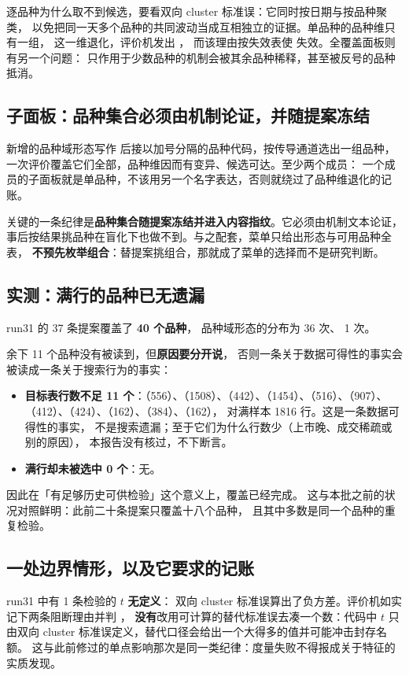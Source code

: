 \documentclass[11pt]{ctexart}
\begin{document}
逐品种为什么取不到候选，要看双向 cluster 标准误：它同时按日期与按品种聚类，
以免把同一天多个品种的共同波动当成互相独立的证据。单品种的品种维只有一组，
这一维退化，评价机发出 ，
而该理由按失效表使  失效。全覆盖面板则有另一个问题：
只作用于少数品种的机制会被其余品种稀释，甚至被反号的品种抵消。

\subsection{子面板：品种集合必须由机制论证，并随提案冻结}
新增的品种域形态写作  后接以加号分隔的品种代码，按传导通道选出一组品种，
一次评价覆盖它们全部，品种维因而有变异、候选可达。至少两个成员：
一个成员的子面板就是单品种，不该用另一个名字表达，否则就绕过了品种维退化的记账。

关键的一条纪律是\textbf{品种集合随提案冻结并进入内容指纹}。它必须由机制文本论证，
事后按结果挑品种在盲化下也做不到。与之配套，菜单只给出形态与可用品种全表，
\textbf{不预先枚举组合}：替提案挑组合，那就成了菜单的选择而不是研究判断。

\subsection{实测：满行的品种已无遗漏}
run31 的 37 条提案覆盖了 \textbf{40 个品种}，
品种域形态的分布为  36 次、 1 次。

余下 11 个品种没有被读到，但\textbf{原因要分开说}，
否则一条关于数据可得性的事实会被读成一条关于搜索行为的事实：

\begin{itemize}
\item \textbf{目标表行数不足 11 个}：（556）、（1508）、（442）、（1454）、（516）、（907）、（412）、（424）、（162）、（384）、（162），
      对满样本 1816 行。这是一条数据可得性的事实，
      不是搜索遗漏；至于它们为什么行数少（上市晚、成交稀疏或别的原因），
      本报告没有核过，不下断言。
\item \textbf{满行却未被选中 0 个}：无。
\end{itemize}

因此在「有足够历史可供检验」这个意义上，覆盖已经完成。
这与本批之前的状况对照鲜明：此前二十条提案只覆盖十八个品种，
且其中多数是同一个品种的重复检验。

\subsection{一处边界情形，以及它要求的记账}
run31 中有 1 条检验的 $t$ \textbf{无定义}：
双向 cluster 标准误算出了负方差。评价机如实记下两条阻断理由并判 ，
\textbf{没有}改用可计算的替代标准误去凑一个数：代码中 $t$ 只由双向 cluster
标准误定义，替代口径会给出一个大得多的值并可能冲击封存名额。
这与此前修过的单点影响那次是同一类纪律：度量失败不得报成关于特征的实质发现。
\end{document}
